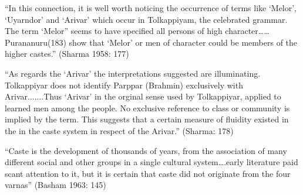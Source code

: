 \begin{myquote}
“In this connection, it is well worth noticing the occurrence of terms like ‘Melor’, ‘Uyarndor’ and ‘Arivar’ which occur in Tolkappiyam, the celebrated grammar. The term ‘Melor” seems to have specified all persons of high character……Purananuru(183) show that ‘Melor’ or men of character could be members of the higher castes.” (Sharma 1958: 177)
\end{myquote}

\begin{myquote}
“As regards the ‘Arivar’ the interpretations suggested are illuminating. Tolkappiyar does not identify Parppar (Brahmin) exclusively with Arivar.......Thus ‘Arivar’ in the orginal sense used by Tolkappiyar, applied to learned men among the people. No exclusive reference to class or community is implied by the term. This suggests that a certain measure of fluidity existed in the in the caste system in respect of the Arivar.” (Sharma: 178)
\end{myquote}

\begin{myquote}
“Caste is the development of thousands of years, from the association of many different social and other groups in a single cultural system….early literature paid scant attention to it, but it is certain that caste did not originate from the four varnas” (Basham 1963: 145)
\end{myquote}

